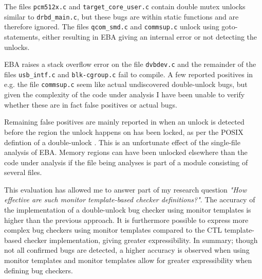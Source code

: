 \newpar The files \texttt{pcm512x.c} and \texttt{target\_core\_user.c} contain double mutex unlocks similar to \texttt{drbd\_main.c}, but these bugs are within static functions and are therefore ignored. The files \texttt{qcom\_smd.c} and \texttt{commsup.c} unlock using goto-statements, either resulting in EBA giving an internal error or not detecting the unlocks. 

\newpar EBA raises a stack overflow error on the file \texttt{dvbdev.c} and the remainder of the files \texttt{usb\_intf.c} and \texttt{blk-cgroup.c} fail to compile. A few reported positives in e.g. the file \texttt{commsup.c} seem like actual undiscovered double-unlock bugs, but given the complexity of the code under analysis I have been unable to verify whether these are in fact false positives or actual bugs. 

\newpar Remaining false positives are mainly reported in when an unlock is detected before the region the unlock happens on has been locked, as per the POSIX defintion of a double-unlock \cite{unlockPOSIX}. This is an unfortunate effect of the single-file analysis of EBA. Memory regions can have been unlocked elsewhere than the code under analysis if the file being analyses is part of a module consisting of several files. 

\newpar This evaluation has allowed me to answer part of my research question \textit{"How effective are such monitor template-based checker definitions?"}. The accuracy of the implementation of a double-unlock bug checker using monitor templates is higher than the previous approach. It is furthermore possible to express more complex bug checkers using monitor templates compared to the CTL template-based checker implementation, giving greater expressibility. In summary; though not all confirmed bugs are detected, a higher accuracy is observed when using monitor templates and monitor templates allow for greater expressibility when defining bug checkers. 